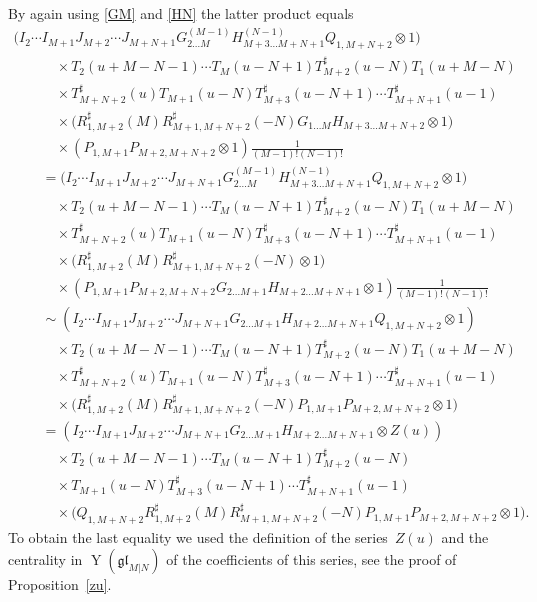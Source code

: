 \documentclass[pdftex]{sigma}
\numberwithin{equation}{section}
\def\glMN{\mathfrak{gl}_{M|N}}
\def\ot{\otimes}
\def\RS{R^{\sharp}}
\def\TS{T^{\sharp}}
\def\YMN{\operatorname{Y}(\glMN)}
\begin{document}
By again using \eqref{GM} and \eqref{HN} the latter product equals
\begin{gather*}
\big( I_{2} \cdots I_{M+1}
J_{M+2} \cdots J_{M+N+1}
G_{2 \dots M}^{(M-1)} H_{M+3 \dots M+N+1}^{(N-1)}
Q_{1,M+N+2}\ot1 \big)\\
\qquad\quad{} \times
T_2 (u+M-N-1) \cdots T_{M} (u-N+1)
\TS_{M+2} (u-N) T_1 (u+M-N)\\
\qquad\quad{} \times
\TS_{M+N+2} (u) T_{M+1} (u-N)
\TS_{M+3} (u-N+1) \cdots \TS_{M+N+1} (u-1)\\
\qquad\quad{} \times
\big( \RS_{1,M+2} (M ) \RS_{M+1,M+N+2} (-N )
G_{1 \dots M} H_{M+3 \dots M+N+2}\ot1 \big)\\
\qquad\quad{} \times
( P_{1,M+1} P_{M+2,M+N+2}\ot1 )
\frac1{(M-1) ! (N-1) !} \\
\qquad{} =
\big( I_{2} \cdots I_{M+1}
J_{M+2} \cdots J_{M+N+1}
G_{2 \dots M}^{(M-1)} H_{M+3 \dots M+N+1}^{(N-1)}
Q_{1,M+N+2}\ot1 \big)\\
\qquad\quad{} \times
T_2 (u+M-N-1) \cdots T_{M} (u-N+1)
\TS_{M+2} (u-N) T_1 (u+M-N)\\
\qquad\quad{} \times
\TS_{M+N+2} (u) T_{M+1} (u-N)
\TS_{M+3} (u-N+1) \cdots \TS_{M+N+1} (u-1)\\
\qquad\quad{} \times
\big( \RS_{1,M+2} (M ) \RS_{M+1,M+N+2} (-N )\ot1 \big)\\
\qquad\quad{} \times
( P_{1,M+1} P_{M+2,M+N+2}
G_{2 \dots M+1} H_{M+2 \dots M+N+1}
\ot1 )
\frac1{(M-1) ! (N-1) !} \\
\qquad{} \sim
( I_{2} \cdots I_{M+1}
J_{M+2} \cdots J_{M+N+1}
G_{2 \dots M+1} H_{M+2 \dots M+N+1} Q_{1,M+N+2}
\ot1 )\\
\qquad\quad{} \times
T_2 (u+M-N-1) \cdots T_{M} (u-N+1)
\TS_{M+2} (u-N) T_1 (u+M-N)\\
\qquad\quad{} \times
\TS_{M+N+2} (u) T_{M+1} (u-N)
\TS_{M+3} (u-N+1) \cdots \TS_{M+N+1} (u-1)\\
\qquad\quad{} \times
\big( \RS_{1,M+2} (M ) \RS_{M+1,M+N+2} (-N )
P_{1,M+1} P_{M+2,M+N+2}\ot1 \big) \\
\qquad{} =
( I_{2} \cdots I_{M+1}
J_{M+2} \cdots J_{M+N+1}
G_{2 \dots M+1} H_{M+2 \dots M+N+1}\ot Z(u) )\\
\qquad\quad{} \times
T_2 (u+M-N-1) \cdots T_{M} (u-N+1)
\TS_{M+2} (u-N)\\
\qquad\quad{} \times
T_{M+1} (u-N)
\TS_{M+3} (u-N+1) \cdots \TS_{M+N+1} (u-1)\\
\qquad\quad{} \times
 \big( Q_{1,M+N+2} \RS_{1,M+2} (M ) \RS_{M+1,M+N+2} (-N )
P_{1,M+1} P_{M+2,M+N+2}\ot1 \big) .
\end{gather*}
To obtain the last equality we used the definition of the series~$Z(u)$
and the centrality in $\YMN$ of the coefficients of this series, see the proof
of Proposition~\ref{zu}.
\end{document}
